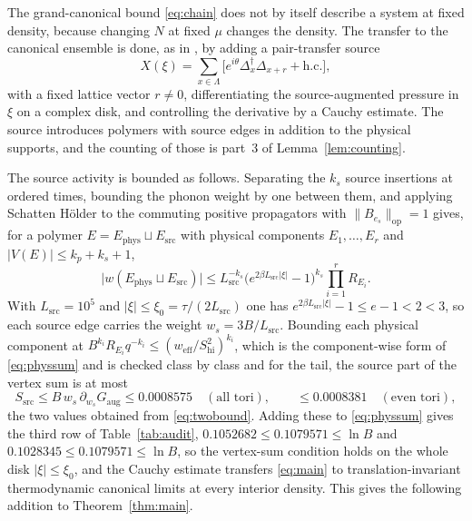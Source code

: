 \documentclass[11pt]{article}
\theoremstyle{plain}
\theoremstyle{definition}
\newcommand{\Dop}{\Delta}
\begin{document}
The grand-canonical bound \eqref{eq:chain} does not by itself describe a system at
fixed density, because changing $N$ at fixed $\mu$ changes the density. The transfer
to the canonical ensemble is done, as in \cite[Section 6]{rens2026a}, by adding a
pair-transfer source
\begin{equation}\label{eq:source}
X(\xi)=\sum_{x\in\Lambda}\bigl[e^{i\theta}\Dop_x^\dagger\Dop_{x+r}
+\text{h.c.}\bigr],
\end{equation}
with a fixed lattice vector $r\ne0$, differentiating the source-augmented pressure in
$\xi$ on a complex disk, and controlling the derivative by a Cauchy estimate. The
source introduces polymers with source edges in addition to the physical supports,
and the counting of those is part~3 of Lemma~\ref{lem:counting}.

The source activity is bounded as follows. Separating the $k_s$ source insertions at
ordered times, bounding the phonon weight by one between them, and applying Schatten
H\"older to the commuting positive propagators with
$\|B_{e_s}\|_{\mathrm{op}}=1$ gives, for a polymer
$E=E_{\mathrm{phys}}\sqcup E_{\mathrm{src}}$ with physical components $E_1,\dots,E_r$
and $|V(E)|\le k_p+k_s+1$,
\begin{equation}\label{eq:srcbound}
\bigl|w(E_{\mathrm{phys}}\sqcup E_{\mathrm{src}})\bigr|
\le L_{\mathrm{src}}^{-k_s}
\bigl(e^{2\beta L_{\mathrm{src}}|\xi|}-1\bigr)^{k_s}\prod_{i=1}^{r}R_{E_i}.
\end{equation}
With $L_{\mathrm{src}}=10^{5}$ and $|\xi|\le\xi_0=\tau/(2L_{\mathrm{src}})$ one has
$e^{2\beta L_{\mathrm{src}}|\xi|}-1\le e-1<2<3$, so each source edge carries the
weight $w_s=3B/L_{\mathrm{src}}$. Bounding each physical component at
$B^{k_i}R_{E_i}q^{-k_i}\le(w_{\mathrm{eff}}/S_{\mathrm{hi}}^{2})^{k_i}$, which is the
component-wise form of \eqref{eq:physsum} and is checked class by class and for the
tail, the source part of the vertex sum is at most
\begin{equation}\label{eq:srcsum}
S_{\mathrm{src}}\le B\,w_s\,\partial_{w_s}G_{\mathrm{aug}}\le0.0008575
\quad(\text{all tori}),\qquad \le0.0008381\quad(\text{even tori}),
\end{equation}
the two values obtained from \eqref{eq:twobound}. Adding these to
\eqref{eq:physsum} gives the third row of Table~\ref{tab:audit},
$0.1052682\le0.1079571\le\ln B$ and $0.1028345\le0.1079571\le\ln B$, so the
vertex-sum condition holds on the whole disk $|\xi|\le\xi_0$, and the Cauchy estimate
transfers \eqref{eq:main} to translation-invariant thermodynamic canonical limits at
every interior density. This gives the following addition to
Theorem~\ref{thm:main}.
\end{document}
